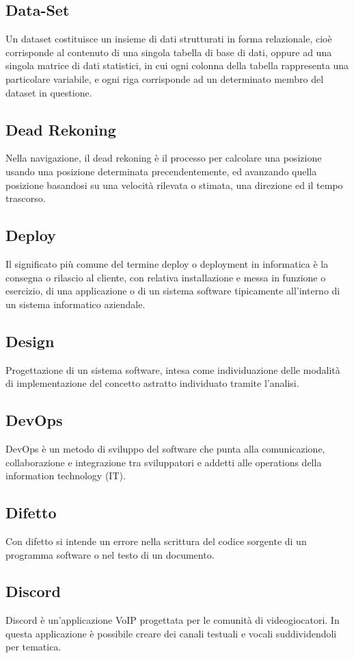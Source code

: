 \subsection{Data-Set}  Un dataset costituisce un insieme di dati strutturati in forma relazionale, cioè corrisponde al contenuto di una singola tabella di base di dati, oppure ad una singola matrice di dati statistici, in cui ogni colonna della tabella rappresenta una particolare variabile, e ogni riga corrisponde ad un determinato membro del dataset in questione.
\subsection{Dead Rekoning}  Nella navigazione, il dead rekoning è il processo per calcolare una posizione usando una posizione determinata precendentemente, ed avanzando quella posizione basandosi su una velocità rilevata o stimata, una direzione ed il tempo trascorso.
\subsection{Deploy}  Il significato più comune del termine deploy o deployment in informatica è la consegna o rilascio al cliente, con relativa installazione e messa in funzione o esercizio, di una applicazione o di un sistema software tipicamente all'interno di un sistema informatico aziendale.
\subsection{Design}  Progettazione di un sistema software, intesa come individuazione delle modalità di implementazione del concetto astratto individuato tramite l'analisi.
\subsection{DevOps}  DevOps è un metodo di sviluppo del software che punta alla comunicazione, collaborazione e integrazione tra sviluppatori e addetti alle operations della information technology (IT).
\subsection{Difetto}  Con difetto si intende un errore nella scrittura del codice sorgente di un programma software o nel testo di un documento.
\subsection{Discord}  Discord è un'applicazione VoIP progettata per le comunità di videogiocatori. In questa applicazione è possibile creare dei canali testuali e vocali suddividendoli per tematica. 
